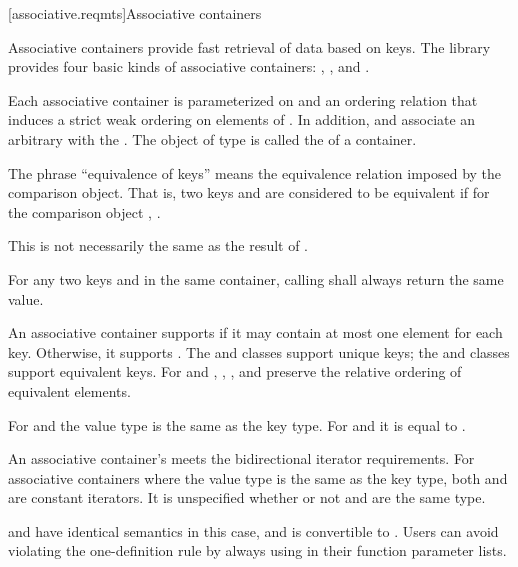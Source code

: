 [associative.reqmts]{Associative containers}

\pnum
Associative containers provide fast retrieval of data based on keys.
The library provides four basic kinds of associative containers:
,
,
and
.

\pnum
Each associative container is parameterized on
and an ordering relation
that induces a strict weak ordering on
elements of
.
In addition,
and
associate an arbitrary 
with the
.
The object of type
is called the
of a container.

\pnum
The phrase ``equivalence of keys'' means the equivalence relation imposed by the
comparison object.
That is, two keys
and
are considered to be equivalent if for the
comparison object
,
.
\begin{note}
This is not necessarily the same as the result of .
\end{note}
For any two keys
and
in the same container, calling
shall always return the same value.

\pnum
An associative container supports  if it may contain at
most one element for each key. Otherwise, it supports .
The  and  classes support unique keys; the 
and  classes support equivalent keys.
For  and ,
, , and  preserve the relative ordering
of equivalent elements.

\pnum
For  and  the value type is the same as the key type.
For  and  it is equal to .

\pnum
{}
{An associative container's  meets the bidirectional iterator requirements.}
For associative containers where the value type is the same as the key type, both
and
are constant iterators. It is unspecified whether or not
and
are the same type.
\begin{note}  and  have identical semantics in this case, and  is convertible to . Users can avoid violating the one-definition rule by always using  in their function parameter lists. \end{note}

